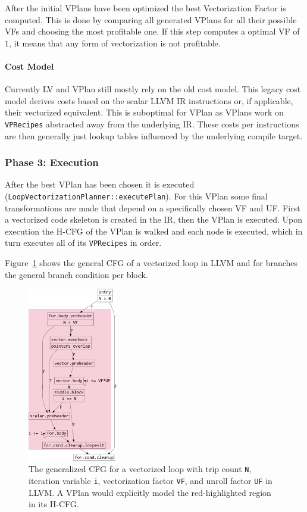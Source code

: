 \documentclass[sigplan,11pt,nonacm]{acmart}
\begin{document}
After the initial VPlans have been optimized the best Vectorization Factor is computed. This is done 
by comparing all generated VPlans for all their possible VFs and choosing the most profitable one. If 
this step computes a optimal VF of $1$, it means that any form of vectorization is not profitable.

\paragraph{Cost Model}
Currently LV and VPlan still mostly rely on the old cost model. This legacy cost model derives costs 
based on the scalar LLVM IR instructions or, if applicable, their vectorized equivalent.
This is suboptimal for VPlan as VPlans work on \texttt{VPRecipes} abstracted away from the underlying 
IR. These costs per instructions are then generally just lookup tables influenced by the underlying 
compile target. 

\subsubsection{Phase 3: Execution}
After the best VPlan has been chosen it is executed (\texttt{LoopVectorizationPlanner::executePlan}).
For this VPlan some final transformations are made that depend on a specifically chosen VF and UF.
First a vectorized code skeleton is created in the IR, then the VPlan is executed. Upon execution 
the H-CFG of the VPlan is walked and each node is executed, which in turn executes all of its 
\texttt{VPRecipes} in order.

Figure~\ref{fig:inner-loop-vec-cfg} shows the general CFG of a vectorized loop in LLVM and for branches 
the general branch condition per block.

\begin{figure}
  \centering
  \includegraphics[width=0.35\textwidth]{images/inner-loop-vec-loop-cfg-color.png}
  \caption{The generalized CFG for a vectorized loop with trip count \texttt{N}, 
  iteration variable \texttt{i}, vectorization factor \texttt{VF}, 
  and unroll factor \texttt{UF} in LLVM. A VPlan would explicitly model the red-highlighted 
  region in its H-CFG.}
  \label{fig:inner-loop-vec-cfg}
\end{figure}
\end{document}

